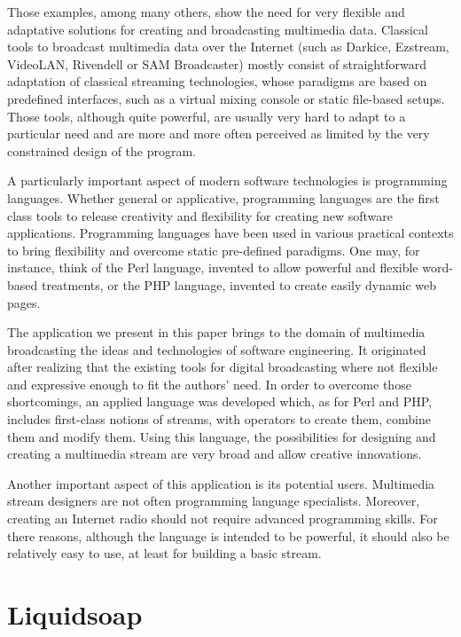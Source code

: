 \documentclass{llncs}
\newcommand{\liquidsoap}{Liquidsoap}
\begin{document}
Those examples, among many others, show the need for very flexible and
adaptative solutions for creating and broadcasting multimedia data. Classical
tools to broadcast multimedia data over the Internet (such as Darkice, Ezstream,
VideoLAN, Rivendell or SAM Broadcaster) mostly consist of straightforward
adaptation of classical streaming technologies, whose paradigms are based on
predefined interfaces, such as a virtual mixing console or static file-based
setups. Those tools, although quite powerful, are usually very hard to adapt to
a particular need and are more and more often perceived as limited by the very
constrained design of the program.

A particularly important aspect of modern software technologies is programming
languages. Whether general or applicative, programming languages are the first 
class tools to release creativity and flexibility for creating new software applications.
Programming languages have been used in various practical contexts to bring flexibility
and overcome static pre-defined paradigms. One may, for instance, think of the Perl 
language, invented to allow powerful and flexible word-based treatments, or the PHP
language, invented to create easily dynamic web pages.

The application we present in this paper brings to the domain of multimedia
broadcasting the ideas and technologies of software engineering. It originated 
after realizing that the existing tools for digital broadcasting where not flexible
and expressive enough to fit the authors' need. In order to overcome those shortcomings,
an applied language was developed which, as for Perl and PHP, includes first-class
notions of streams, with operators to create them, combine them and modify them.
Using this language, the possibilities for designing and creating a multimedia stream
are very broad and allow creative innovations.

Another important aspect of this application is its potential users. Multimedia stream 
designers are not often programming language specialists. Moreover, creating an Internet 
radio should not require advanced programming skills.
For there reasons, although the language is intended to be powerful, it should 
also be relatively easy to use, at least for building a basic stream.

\section{\liquidsoap}
\end{document}
